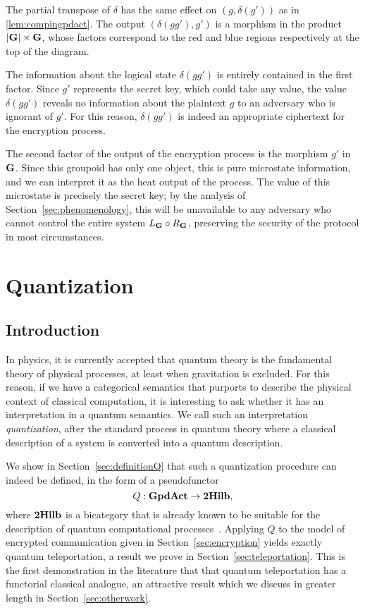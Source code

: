 \documentclass[a4paper,12pt]{article}
\theoremstyle{definition}
\newcommand\cat[1]{{\ensuremath{\bf #1}}}
\renewcommand{\-}[0]{\nobreakdash-\hspace{0pt}}
\newcommand\GA{\cat{GpdAct}{}}
\newcommand\GB{\ensuremath{R_{\cat G}}}
\newcommand\BG{\ensuremath{L _{\cat G}}}
\begin{document}
The partial transpose of $\delta$ has the same effect on $(g, \delta(g'))$ as in \ref{lem:compingpdact}. The output $(\delta(gg'), g')$ is a morphism in the product $\cat {|G|} \times \cat G$, whose factors correspond to the red and blue regions respectively at the top of the diagram.

The information about the logical state $\delta(gg')$ is entirely contained in the first factor. Since $g'$ represents the secret key, which could take any value, the value $\delta(gg')$ reveals no information about the plaintext $g$ to an adversary who is ignorant of $g'$. For this reason, $\delta(gg')$ is indeed an appropriate ciphertext for the encryption process.

The second factor of the output of the encryption process is the morphism $g'$ in \cat G. Since this groupoid has only one object, this is pure microstate information, and we can interpret it as the heat output of the process. The value of this microstate is precisely the secret key; by the analysis of Section~\ref{sec:phenomenology}, this will be unavailable to any adversary who cannot control the entire system $\BG \circ \GB$, preserving the security of the protocol in most circumstances.

\section{Quantization}
\label{sec:quantum}

\subsection{Introduction}

\noindent
In physics, it is currently accepted that quantum theory is the fundamental theory of physical processes, at least when gravitation is excluded. For this reason, if we have a categorical semantics that purports to describe the physical context of classical computation, it is interesting to ask whether it has an interpretation in a quantum semantics. We call such an interpretation \emph{quantization}, after the standard process in quantum theory where a classical description of a system is converted into a quantum description.

We show in Section~\ref{sec:definitionQ} that such a quantization procedure can indeed be defined, in the form of a pseudofunctor $$\mbox{$Q : \GA \to \cat{2Hilb}$},$$ where \cat{2Hilb} is a bicategory that is already known to be suitable for the description of quantum computational processes~\cite{b97-hda2, v12-hsqp}.
Applying $Q$ to the model of encrypted communication given in Section~\ref{sec:encryption} yields exactly quantum teleportation, a result we prove in Section~\ref{sec:teleportation}. This is the first demonstration in the literature that that quantum teleportation has a functorial classical analogue, an attractive result which we discuss in greater length in Section~\ref{sec:otherwork}.
\end{document}
